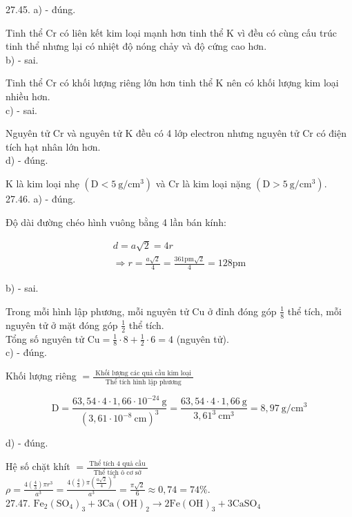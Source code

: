 \documentclass[10pt]{article}
\begin{document}
27.45. a) - đúng.

Tinh thể Cr có liên kết kim loại mạnh hơn tinh thể K vì đều có cùng cấu trúc tinh thể nhưng lại có nhiệt độ nóng chảy và độ cứng cao hơn.\\
b) - sai.

Tinh thể Cr có khối lượng riêng lớn hơn tinh thể K nên có khối lượng kim loại nhiều hơn.\\
c) - sai.

Nguyên tử Cr và nguyên tử K đều có 4 lớp electron nhưng nguyên tử Cr có điện tích hạt nhân lớn hơn.\\
d) - đúng.

K là kim loại nhẹ $\left(\mathrm{D}<5 \mathrm{~g} / \mathrm{cm}^{3}\right)$ và Cr là kim loại nặng $\left(\mathrm{D}>5 \mathrm{~g} / \mathrm{cm}^{3}\right)$.\\
27.46. a) - đúng.

Độ dài đường chéo hình vuông bằng 4 lần bán kính:

$$
\begin{gathered}
d=a \sqrt{2}=4 r \\
\Rightarrow r=\frac{a \sqrt{2}}{4}=\frac{361 \mathrm{pm} \sqrt{2}}{4}=128 \mathrm{pm}
\end{gathered}
$$

b) - sai.

Trong mỗi hình lập phương, mỗi nguyên tử Cu ở đỉnh đóng góp $\frac{1}{8}$ thể tích, mỗi nguyên tử ở mặt đóng góp $\frac{1}{2}$ thể tích.\\
Tổng số nguyên tử $\mathrm{Cu}=\frac{1}{8} \cdot 8+\frac{1}{2} \cdot 6=4$ (nguyên tử).\\
c) - đúng.

Khối lượng riêng $=\frac{\text { Khối lượng các quả cầu kim loại }}{\text { Thể tích hình lập phương }}$

$$
\mathrm{D}=\frac{63,54 \cdot 4 \cdot 1,66 \cdot 10^{-24} \mathrm{~g}}{\left(3,61 \cdot 10^{-8} \mathrm{~cm}\right)^{3}}=\frac{63,54 \cdot 4 \cdot 1,66 \mathrm{~g}}{3,61^{3} \mathrm{~cm}^{3}}=8,97 \mathrm{~g} / \mathrm{cm}^{3}
$$

d) - đúng.

Hệ số chặt khít $=\frac{\text { Thể tích } 4 \text { quả cầu }}{\text { Thể tích ô cơ sở }}$\\
$\rho=\frac{4\left(\frac{4}{3}\right) \pi r^{3}}{a^{3}}=\frac{4\left(\frac{4}{3}\right) \pi\left(\frac{a \sqrt{2}}{4}\right)^{3}}{a^{3}}=\frac{\pi \sqrt{2}}{6} \approx 0,74=74 \%$.\\
27.47. $\mathrm{Fe}_{2}\left(\mathrm{SO}_{4}\right)_{3}+3 \mathrm{Ca}(\mathrm{OH})_{2} \longrightarrow 2 \mathrm{Fe}(\mathrm{OH})_{3}+3 \mathrm{CaSO}_{4}$
\end{document}
